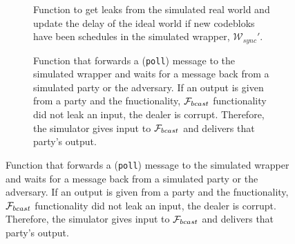 \begin{figure}
	\begin{subfigure}{\textwidth}
	
	\label{fig:algo:simgetleaks}
	\caption{Function to get leaks from the simulated real world and update the delay of the ideal world if new codebloks have been schedules in the simulated wrapper, $\mathcal{W}_{sync}'$.}
	\end{subfigure}
	\newline
	\begin{subfigure}{\textwidth}
	
	\label{fig:algo:poll}
	\caption{Function that forwards a (\texttt{poll}) message to the simulated wrapper and waits for a message back from a simulated party or the adversary. If an output is given from a party and the fnuctionality, $\mathcal{F}_{bcast}$ functionality did not leak an input, the dealer is corrupt. Therefore, the simulator gives input to $\mathcal{F}_{bcast}$ and delivers that party's output.}
	\end{subfigure}
\end{figure}
